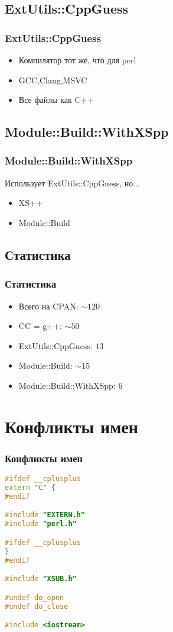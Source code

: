 \documentclass[utf8x]{beamer}
\begin{document}
\subsection{ExtUtils::CppGuess}
\begin{frame}[fragile]
    \frametitle{ExtUtils::CppGuess}
    
    \begin{itemize}
        \item Компилятор тот же, что для perl
        \item GCC,Clang,MSVC
        \item Все файлы как C++
    \end{itemize}
\end{frame}

\subsection{Module::Build::WithXSpp}
\begin{frame}
    \frametitle{Module::Build::WithXSpp}
    Использует ExtUtils::CppGuess, но...
    \begin{itemize}
        \item XS++
        \item Module::Build
    \end{itemize}
\end{frame}

\subsection{Статистика}
\begin{frame}
    \frametitle{Статистика}
    \begin{itemize}
        \item Всего на CPAN: $\sim120$
        \item CC = g++: $\sim50$
        \item ExtUtils::CppGuess: $13$
        \item Module::Build: $\sim15$
        \item Module::Build::WithXSpp: $6$
    \end{itemize}
\end{frame}

\section{Конфликты имен}

\begin{frame}[fragile]
    \frametitle{Конфликты имен}
    \begin{lstlisting}[language=C++,style=PerlXS]
#ifdef __cplusplus
extern "C" {
#endif

#include "EXTERN.h"
#include "perl.h"

#ifdef __cplusplus
}
#endif

#include "XSUB.h"

#undef do_open
#undef do_close

#include <iostream>
    \end{lstlisting}
\end{frame}
\end{document}
